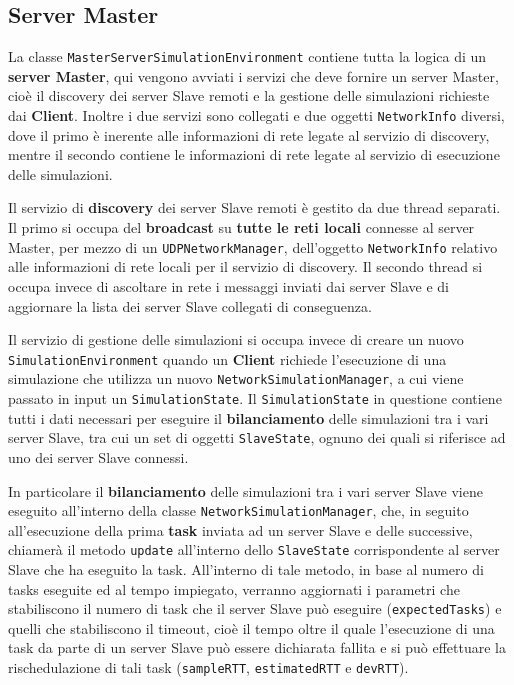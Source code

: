 \subsection{Server Master}

La classe \texttt{MasterServerSimulationEnvironment} contiene tutta la logica di un \textbf{server Master}, qui vengono avviati i servizi che deve fornire un server Master, cioè il discovery dei server Slave remoti e la gestione delle simulazioni richieste dai \textbf{Client}. Inoltre i due servizi sono collegati e due oggetti \texttt{NetworkInfo} diversi, dove il primo è inerente alle informazioni di rete legate al servizio di discovery, mentre il secondo contiene le informazioni di rete legate al servizio di esecuzione delle simulazioni.

Il servizio di \textbf{discovery} dei server Slave remoti è gestito da due thread separati. Il primo si occupa del \textbf{broadcast} su \textbf{tutte le reti locali} connesse al server Master, per mezzo di un \texttt{UDPNetworkManager}, dell'oggetto \texttt{NetworkInfo} relativo alle informazioni di rete locali per il servizio di discovery. Il secondo thread si occupa invece di ascoltare in rete i messaggi inviati dai server Slave e di aggiornare la lista dei server Slave collegati di conseguenza.

Il servizio di gestione delle simulazioni si occupa invece di creare un nuovo \texttt{SimulationEnvironment} quando un \textbf{Client} richiede l'esecuzione di una simulazione che utilizza un nuovo \texttt{NetworkSimulationManager}, a cui viene passato in input un \texttt{SimulationState}. Il \texttt{SimulationState} in questione contiene tutti i dati necessari per eseguire il \textbf{bilanciamento} delle simulazioni tra i vari server Slave, tra cui un set di oggetti \texttt{SlaveState}, ognuno dei quali si riferisce ad uno dei server Slave connessi.

In particolare il \textbf{bilanciamento} delle simulazioni tra i vari server Slave viene eseguito all'interno della classe \texttt{NetworkSimulationManager}, che, in seguito all'esecuzione della prima \textbf{task} inviata ad un server Slave e delle successive, chiamerà il metodo \texttt{update} all'interno dello \texttt{SlaveState} corrispondente al server Slave che ha eseguito la task. All'interno di tale metodo, in base al numero di tasks eseguite ed al tempo impiegato, verranno aggiornati i parametri che stabiliscono il numero di task che il server Slave può eseguire (\texttt{expectedTasks}) e quelli che stabiliscono il timeout, cioè il tempo oltre il quale l'esecuzione di una task da parte di un server Slave può essere dichiarata fallita e si può effettuare la rischedulazione di tali task (\texttt{sampleRTT}, \texttt{estimatedRTT} e \texttt{devRTT}).

